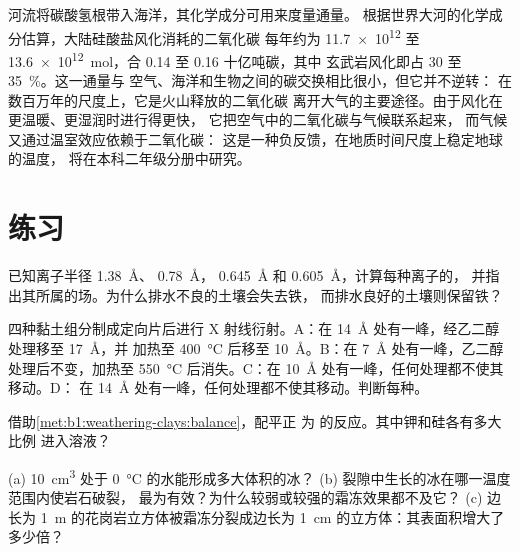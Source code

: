 河流将碳酸氢根带入海洋，其化学成分可用来度量通量。
根据世界大河的化学成分估算，大陆硅酸盐风化消耗的二氧化碳
每年约为 \num{11.7e12} 至
\qty{13.6e12}{mol}，合 0.14 至 0.16 十亿吨碳，其中
玄武岩风化即占 30 至 \qty{35}{\percent}。这一通量与
空气、海洋和生物之间的碳交换相比很小，但它并不逆转：
在数百万年的尺度上，它是火山释放的二氧化碳
离开大气的主要途径。由于风化在更温暖、更湿润时进行得更快，
它把空气中的二氧化碳与气候联系起来，
而气候又通过温室效应依赖于二氧化碳：
这是一种负反馈，在地质时间尺度上稳定地球的温度，
将在本科二年级分册中研究。

\section{练习}

\begin{exercise}[$\star$]\label{exo:b1:weathering-clays:1}
已知离子半径  \qty{1.38}{\angstrom}、 \qty{0.78}{\angstrom}，
 \qty{0.645}{\angstrom} 和  \qty{0.605}{\angstrom}，计算每种离子的，
并指出其所属的场。为什么排水不良的土壤会失去铁，
而排水良好的土壤则保留铁？
\end{exercise}

\begin{exercise}[$\star$]\label{exo:b1:weathering-clays:2}
四种黏土组分制成定向片后进行 X 射线衍射。A：在
\SI{14}{\angstrom} 处有一峰，经乙二醇处理移至 \SI{17}{\angstrom}，并
加热至 \SI{400}{\celsius} 后移至 \SI{10}{\angstrom}。B：在
\SI{7}{\angstrom} 处有一峰，乙二醇处理后不变，加热至
\SI{550}{\celsius} 后消失。C：在 \SI{10}{\angstrom} 处有一峰，任何处理都不使其移动。D：
在 \SI{14}{\angstrom} 处有一峰，任何处理都不使其移动。判断每种。
\end{exercise}

\begin{exercise}[$\star$]\label{exo:b1:weathering-clays:3}
借助\cref{met:b1:weathering-clays:balance}，配平正  为
的反应。其中钾和硅各有多大比例
进入溶液？
\end{exercise}

\begin{exercise}[$\star$]\label{exo:b1:weathering-clays:4}
(a) \qty{10}{cm^3} 处于 \qty{0}{\celsius} 的水能形成多大体积的冰？
(b) 裂隙中生长的冰在哪一温度范围内使岩石破裂，
最为有效？为什么较弱或较强的霜冻效果都不及它？
(c) 边长为 \qty{1}{m} 的花岗岩立方体被霜冻分裂成边长为
\qty{1}{cm} 的立方体：其表面积增大了多少倍？
\end{exercise}

